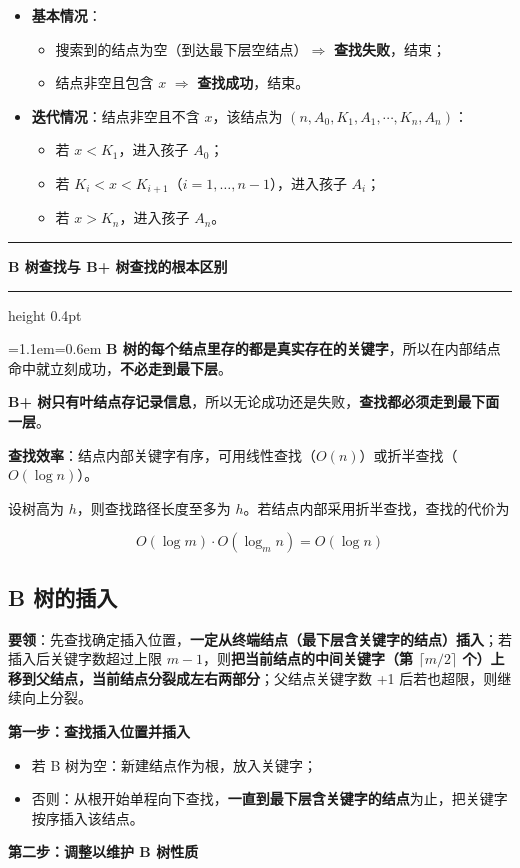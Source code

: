 \documentclass[11pt,openany,UTF8]{ctexbook}
\newcommand{\callouthead}[2]{%
  \par\addvspace{7pt}\noindent
  {\color{#1}\rule[-0.15em]{3pt}{1.05em}}\hspace{0.5em}%
  {\bfseries\color{#1}#2}\par\nobreak\vspace{-0.35em}%
  {\color{rulesep}\hrule height 0.4pt}\nobreak\vspace{0.45em}%
  \begingroup\small\setlength{\parindent}{0pt}%
  \leftskip=1.1em\rightskip=0.6em\noindent\ignorespaces}
\newcommand{\calloutend}{\par\endgroup\addvspace{7pt}}
\newenvironment{callkey}[1]{\callouthead{keybar}{#1}}{\calloutend}
\begin{document}
\begin{itemize}
\item \textbf{基本情况}：
\begin{itemize}
\item 搜索到的结点为空（到达最下层空结点）$\Rightarrow$ \textbf{查找失败}，结束；
\item 结点非空且包含 $x$ $\Rightarrow$ \textbf{查找成功}，结束。
\end{itemize}
\item \textbf{迭代情况}：结点非空且不含 $x$，该结点为 $(n,A_0,K_1,A_1,\cdots,K_n,A_n)$：
\begin{itemize}
\item 若 $x<K_1$，进入孩子 $A_0$；
\item 若 $K_i<x<K_{i+1}$（$i=1,\ldots,n-1$），进入孩子 $A_i$；
\item 若 $x>K_n$，进入孩子 $A_n$。
\end{itemize}
\end{itemize}
\begin{callkey}{B 树查找与 B+ 树查找的根本区别}
\textbf{B 树的每个结点里存的都是真实存在的关键字}，所以在内部结点命中就立刻成功，\textbf{不必走到最下层}。

\textbf{B+ 树只有叶结点存记录信息}，所以无论成功还是失败，\textbf{查找都必须走到最下面一层}。

\end{callkey}

\textbf{查找效率}：结点内部关键字有序，可用线性查找（$O(n)$）或折半查找（$O(\log n)$）。

设树高为 $h$，则查找路径长度至多为 $h$。若结点内部采用折半查找，查找的代价为

\[O(\log m)\cdot O(\log_m n)=O(\log n)\]

\subsection{B 树的插入}

\textbf{要领}：先查找确定插入位置，\textbf{一定从终端结点（最下层含关键字的结点）插入}；若插入后关键字数超过上限 $m-1$，则\textbf{把当前结点的中间关键字（第 $\lceil m/2\rceil$ 个）上移到父结点，当前结点分裂成左右两部分}；父结点关键字数 +1 后若也超限，则继续向上分裂。

\textbf{第一步：查找插入位置并插入}

\begin{itemize}
\item 若 B 树为空：新建结点作为根，放入关键字；
\item 否则：从根开始单程向下查找，\textbf{一直到最下层含关键字的结点}为止，把关键字按序插入该结点。
\end{itemize}
\textbf{第二步：调整以维护 B 树性质}
\end{document}
